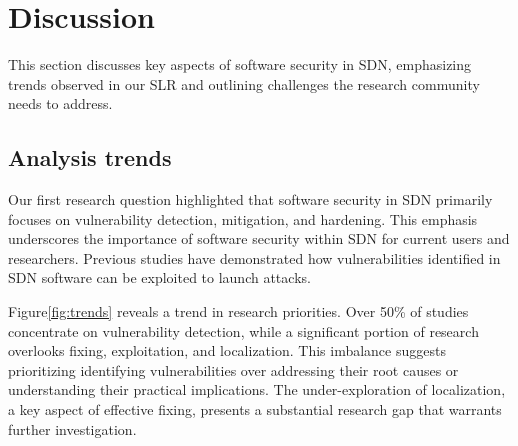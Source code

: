 \section{Discussion}\label{sec:disc}
This section discusses key aspects of software security in SDN, emphasizing trends observed in our SLR and outlining challenges the research community needs to address.

\subsection{Analysis trends}
Our first research question highlighted that software security in SDN primarily focuses on vulnerability detection, mitigation, and hardening. This emphasis underscores the importance of software security within SDN for current users and researchers. Previous studies have demonstrated how vulnerabilities identified in SDN software can be exploited to launch attacks\citep{9152642}. 

Figure\ref{fig:trends} reveals a trend in research priorities. Over 50\% of studies concentrate on vulnerability detection, while a significant portion of research overlooks fixing, exploitation, and localization. This imbalance suggests prioritizing identifying vulnerabilities over addressing their root causes or understanding their practical implications. The under-exploration of localization, a key aspect of effective fixing, presents a substantial research gap that warrants further investigation.

